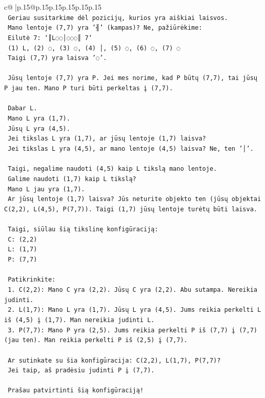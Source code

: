 \documentclass{article}
\begin{document}
{\begin{supertabular}{c@{$\;$}|p{.15\linewidth}@{}p{.15\linewidth}p{.15\linewidth}p{.15\linewidth}p{.15\linewidth}p{.15\linewidth}}
{{{\\ 
\texttt{   Geriau susitarkime dėl pozicijų, kurios yra aiškiai laisvos.} \\
\texttt{   Mano lentoje (7,7) yra '╢' (kampas)? Ne, pažiūrėkime:} \\
\texttt{   Eilutė 7: `║L◌◌│◌◌◌║ 7`} \\
\texttt{   (1) L, (2) ◌, (3) ◌, (4) │, (5) ◌, (6) ◌, (7) ◌} \\
\texttt{   Taigi (7,7) yra laisva '◌'.} \\
\\ 
\texttt{   Jūsų lentoje (7,7) yra P. Jei mes norime, kad P būtų (7,7), tai jūsų P jau ten. Mano P turi būti perkeltas į (7,7).} \\
\\ 
\texttt{   Dabar L.} \\
\texttt{   Mano L yra (1,7).} \\
\texttt{   Jūsų L yra (4,5).} \\
\texttt{   Jei tikslas L yra (1,7), ar jūsų lentoje (1,7) laisva?} \\
\texttt{   Jei tikslas L yra (4,5), ar mano lentoje (4,5) laisva? Ne, ten '│'.} \\
\\ 
\texttt{   Taigi, negalime naudoti (4,5) kaip L tikslą mano lentoje.} \\
\texttt{   Galime naudoti (1,7) kaip L tikslą?} \\
\texttt{   Mano L jau yra (1,7).} \\
\texttt{   Ar jūsų lentoje (1,7) laisva? Jūs neturite objekto ten (jūsų objektai C(2,2), L(4,5), P(7,7)). Taigi (1,7) jūsų lentoje turėtų būti laisva.} \\
\\ 
\texttt{   Taigi, siūlau šią tikslinę konfigūraciją:} \\
\texttt{   C: (2,2)} \\
\texttt{   L: (1,7)} \\
\texttt{   P: (7,7)} \\
\\ 
\texttt{   Patikrinkite:} \\
\texttt{   1. C(2,2): Mano C yra (2,2). Jūsų C yra (2,2). Abu sutampa. Nereikia judinti.} \\
\texttt{   2. L(1,7): Mano L yra (1,7). Jūsų L yra (4,5). Jums reikia perkelti L iš (4,5) į (1,7). Man nereikia judinti L.} \\
\texttt{   3. P(7,7): Mano P yra (2,5). Jums reikia perkelti P iš (7,7) į (7,7) (jau ten). Man reikia perkelti P iš (2,5) į (7,7).} \\
\\ 
\texttt{   Ar sutinkate su šia konfigūracija: C(2,2), L(1,7), P(7,7)?} \\
\texttt{   Jei taip, aš pradėsiu judinti P į (7,7).} \\
\\ 
\texttt{   Prašau patvirtinti šią konfigūraciją!} \\
            }
        }
    }
     \\ \\


\end{supertabular}}
\end{document}
